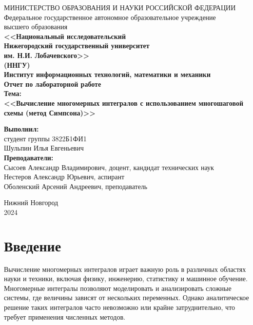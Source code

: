 \documentclass[12pt,a4paper]{article}
\begin{document}
\begin{center} 
МИНИСТЕРСТВО ОБРАЗОВАНИЯ И НАУКИ РОССИЙСКОЙ ФЕДЕРАЦИИ \\
Федеральное государственное автономное образовательное учреждение  \\
высшего образования\\ \textbf{<<Национальный исследовательский \\ Нижегородский государственный университет \\
им. Н.И. Лобачевского>>}\\
\textbf{(ННГУ)}\\[0.5cm]
\textbf{Институт информационных технологий, математики и механики}\\[4.5cm]

\textbf{\large Отчет по лабораторной работе} \\[0.6cm] %
\textbf{Тема:}\\
  \textbf{\large <<Вычисление многомерных интегралов с использованием многошаговой схемы (метод Симпсона)>>}\\[3.0cm]
\begin{flushright}
 \begin{minipage}{0.40\textwidth} %
 \begin{flushleft} %
  \textbf{Выполнил:}\\[0.1cm]
  студент группы 3822Б1ФИ1 \\
  Шульпин Илья Евгеньевич  \\[1.0cm]
  \textbf{Преподаватели:}\\[0.1cm]
  Сысоев Александр Владимирович, доцент, кандидат технических наук  \\[0.1cm]
  Нестеров Александр Юрьевич, аспирант  \\[0.1cm]
  Оболенский Арсений Андреевич, преподаватель  \\
 \end{flushleft} %
 \end{minipage} %
\end{flushright}
 \vfill 

  Нижний Новгород \\
 2024

 \thispagestyle{empty} 

\end{center}

\newpage
\section*{Введение}
\indent Вычисление многомерных интегралов играет важную роль в различных областях науки и техники, включая физику, инженерию, статистику и машинное обучение. Многомерные интегралы позволяют моделировать и анализировать сложные системы, где величины зависят от нескольких переменных. Однако аналитическое решение таких интегралов часто невозможно или крайне затруднительно, что требует применения численных методов.
\end{document}
